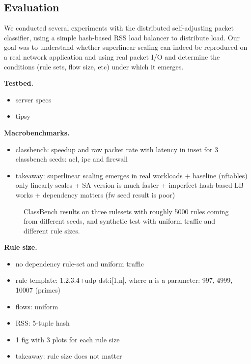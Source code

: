 \subsection{Evaluation}
\label{sec:sa-nf-tables-eval}

We conducted several experiments with the distributed self-adjusting packet classifier, using a simple hash-based RSS load balancer to distribute load. Our goal was to understand whether superlinear scaling can indeed be reproduced on a real network application and using real packet I/O and determine the conditions (rule sets, flow size, etc) under which it emerges.

\noindent
\textbf{Testbed.} %

\begin{itemize}
\item server specs
\item tipsy~\cite{8468219}
\end{itemize}

\noindent
\textbf{Macrobenchmarks.} %
\begin{itemize}
\item classbench: speedup and raw packet rate with latency in inset for 3 classbench seeds: acl, ipc and firewall
\item takeaway: superlinear scaling emerges in real workloads + baseline (nftables) only linearly scales + SA version is much faster + imperfect hash-based LB works + dependency matters (fw seed result is poor)
\end{itemize}

\begin{figure*}
  \centering
  \subfloat[][acl1]{
    
    \label{fig:classbench-acl1}
  }
  \hspace{-1em}
  \subfloat[][ipc1]{
    
    \label{fig:classbench-ipc1}
  }
  \hspace{-1em}
  \subfloat[][fw1]{
    
    \label{fig:classbench-fw1}
  }
  \hspace{-1em}
  \caption{ClassBench results on three rulesets with roughly 5000 rules coming from different seeds, and synthetic test with uniform traffic and different rule sizes.}
  \label{fig:classbench}
\end{figure*}

\noindent
\textbf{Rule size.} %
\begin{itemize}
\item no dependency rule-set and uniform traffic
\item rule-template: 1.2.3.4+udp-dst:i[1,n], where n is a parameter: 997, 4999, 10007 (primes)
\item flows: uniform
\item RSS: 5-tuple hash
\item 1 fig with 3 plots for each rule size
\item takeaway: rule size does not matter
\end{itemize}

